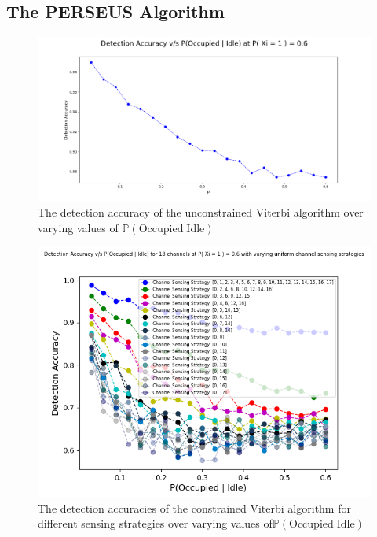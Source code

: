\documentclass[10pt,twocolumn]{IEEEtran}
\begin{document}
\subsection{The PERSEUS Algorithm}
\begin{figure}
    \centering
    \includegraphics[scale=0.255]{DetectionAccuracy_v_p_test_3_final.png}
    \caption{The detection accuracy of the unconstrained Viterbi algorithm over varying values of $\mathbb{P}(\text{Occupied}|\text{Idle})$}
    \label{fig:2}
\end{figure}
\begin{figure}
    \centering
    \includegraphics[scale=0.5]{Uniform_Channel_Sensing.png}
    \caption{The detection accuracies of the constrained Viterbi algorithm for different sensing strategies over varying values of$\mathbb{P}(\text{Occupied}|\text{Idle})$}
    \label{fig:3}
\end{figure}
\end{document}

